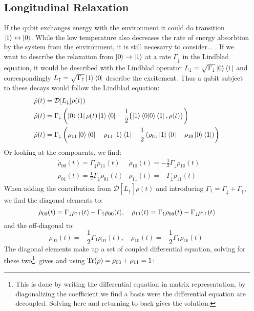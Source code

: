 \subsection{Longitudinal Relaxation}\label{sec:theory_t1}
If the qubit exchanges energy with the environment it could do transition $\ket{1} \leftrightarrow \ket{0}$. While the low temperature also decreases the rate of energy absorbtion by the system from the environment, it is still necesarry to consider... . If we want to describe the relaxation from $\ket{0}\to\ket{1}$ at a rate $\Gamma_\downarrow$ in the Lindblad equation, it would be described with the Lindblad operator $L_{\downarrow} = \sqrt{\Gamma_{\downarrow}} \ket{0}\bra{1}$ and correspondingly $L{_\uparrow} = \sqrt{\Gamma_{\uparrow}} \ket{1}\bra{0}$ describe the excitement. Thus a qubit subject to these decays would follow the Lindblad equation: 
\begin{align*}
    \dot{\rho}(t) &= \mathcal{D}[L_{\downarrow}]\rho(t)) \\
    \dot{\rho}(t) &= \Gamma_\downarrow\left(\ket{0}\bra{1} \rho(t) \ket{1}\bra{0} - \frac12 \{\ket{1}\bra{0}\ket{0}\bra{1}, \rho(t)\}\right) \\
    \dot{\rho}(t) &= \Gamma_\downarrow\left(\rho_{11}\ket{0}\bra{0} - \rho_{11} \ket{1}\bra{1} - \frac12\left(\rho_{01}\ket{1}\bra{0} + \rho_{10}\ket{0}\bra{1}\right)\right)
\end{align*}
Or looking at the components, we find:
\begin{align*}
    &\dot{\rho}_{00}(t) = \Gamma_\downarrow\rho_{11}(t)  &\dot{\rho}_{10}(t) = -\frac12\Gamma_\downarrow\rho_{10}(t)\; \\   
    &\dot{\rho}_{01}(t) = \frac12 \Gamma_\downarrow\rho_{01}(t)   &\dot{\rho}_{11}(t) = -\Gamma_\downarrow\rho_{11}(t)\;
\end{align*}
When adding the contribution from $\mathcal{D}[L_\uparrow]\rho(t)$ and introducing $\Gamma_1 = \Gamma_\downarrow + \Gamma_\uparrow$, we find the diagonal elements to:
\begin{equation}
    \dot{\rho}_{00}(t) = \Gamma_\downarrow\rho_{11}(t) - \Gamma_\uparrow\rho_{00}(t), \quad \dot{\rho}_{11}(t) = \Gamma_\uparrow\rho_{00}(t)-\Gamma_\downarrow\rho_{11}(t)\; \\   
\end{equation}
and the off-diagonal to:
\begin{equation}
    \dot{\rho}_{01}(t) = -\frac12 \Gamma_1\rho_{01}(t),  \quad \dot{\rho}_{10}(t) = -\frac12\Gamma_1\rho_{10}(t) \;
\end{equation}
The diagonal elements make up a set of coupled differential equation, solving for these two\footnote{This is done by writing the differential equation in matrix representation, by diagonalizing the coefficient we find a basis were the differential equation are decoupled. Solving here and returning to back gives the solution. }.  gives and using $\Tr(\rho) = \rho_{00} + \rho_{11} = 1$:

